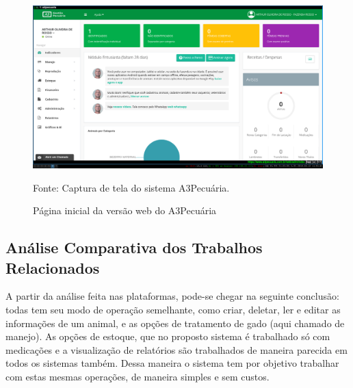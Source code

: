 \begin{figure}[H]
	\begin{center}
		\caption{Página inicial da versão web do A3Pecuária}
		\includegraphics[width=\textwidth]{../img/a3pecuaria.png}

		Fonte: Captura de tela do sistema A3Pecuária.
	\end{center}
\end{figure}





\subsection{\textbf{Análise Comparativa dos Trabalhos Relacionados}}

A partir da análise feita nas plataformas, pode-se chegar na seguinte conclusão: todas tem seu modo de operação semelhante, como criar, deletar, ler e editar as informações de um animal, e as opções de tratamento de gado (aqui chamado de manejo). As opções de estoque, que no proposto sistema é trabalhado só com medicações e a visualização de relatórios são trabalhados de maneira parecida em todos os sistemas também. Dessa maneira o sistema tem por objetivo trabalhar com estas mesmas operações, de maneira simples e sem custos.


